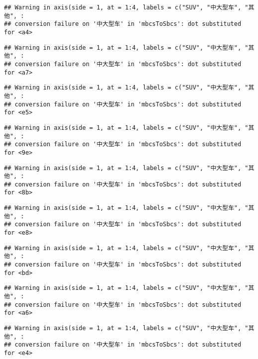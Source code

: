 \documentclass[]{article}
\begin{document}
\begin{verbatim}
## Warning in axis(side = 1, at = 1:4, labels = c("SUV", "中大型车", "其他", :
## conversion failure on '中大型车' in 'mbcsToSbcs': dot substituted for <a4>
\end{verbatim}

\begin{verbatim}
## Warning in axis(side = 1, at = 1:4, labels = c("SUV", "中大型车", "其他", :
## conversion failure on '中大型车' in 'mbcsToSbcs': dot substituted for <a7>
\end{verbatim}

\begin{verbatim}
## Warning in axis(side = 1, at = 1:4, labels = c("SUV", "中大型车", "其他", :
## conversion failure on '中大型车' in 'mbcsToSbcs': dot substituted for <e5>
\end{verbatim}

\begin{verbatim}
## Warning in axis(side = 1, at = 1:4, labels = c("SUV", "中大型车", "其他", :
## conversion failure on '中大型车' in 'mbcsToSbcs': dot substituted for <9e>
\end{verbatim}

\begin{verbatim}
## Warning in axis(side = 1, at = 1:4, labels = c("SUV", "中大型车", "其他", :
## conversion failure on '中大型车' in 'mbcsToSbcs': dot substituted for <8b>
\end{verbatim}

\begin{verbatim}
## Warning in axis(side = 1, at = 1:4, labels = c("SUV", "中大型车", "其他", :
## conversion failure on '中大型车' in 'mbcsToSbcs': dot substituted for <e8>
\end{verbatim}

\begin{verbatim}
## Warning in axis(side = 1, at = 1:4, labels = c("SUV", "中大型车", "其他", :
## conversion failure on '中大型车' in 'mbcsToSbcs': dot substituted for <bd>
\end{verbatim}

\begin{verbatim}
## Warning in axis(side = 1, at = 1:4, labels = c("SUV", "中大型车", "其他", :
## conversion failure on '中大型车' in 'mbcsToSbcs': dot substituted for <a6>
\end{verbatim}

\begin{verbatim}
## Warning in axis(side = 1, at = 1:4, labels = c("SUV", "中大型车", "其他", :
## conversion failure on '中大型车' in 'mbcsToSbcs': dot substituted for <e4>
\end{verbatim}
\end{document}
